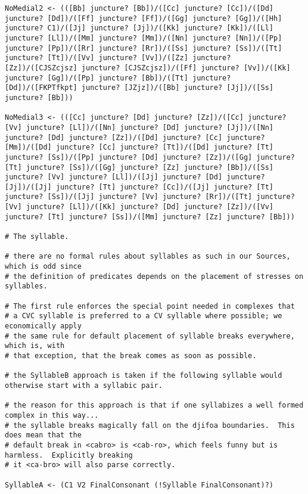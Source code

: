 \documentclass{article}
\begin{document}
\begin{verbatim}
NoMedial2 <- (([Bb] juncture? [Bb])/([Cc] juncture? [Cc])/([Dd] juncture? [Dd])/([Ff] juncture? [Ff])/([Gg] juncture? [Gg])/([Hh] juncture? C1)/([Jj] juncture? [Jj])/([Kk] juncture? [Kk])/([Ll] juncture? [Ll])/([Mm] juncture? [Mm])/([Nn] juncture? [Nn])/([Pp] juncture? [Pp])/([Rr] juncture? [Rr])/([Ss] juncture? [Ss])/([Tt] juncture? [Tt])/([Vv] juncture? [Vv])/([Zz] juncture? [Zz])/([CJSZcjsz] juncture? [CJSZcjsz])/([Ff] juncture? [Vv])/([Kk] juncture? [Gg])/([Pp] juncture? [Bb])/([Tt] juncture? [Dd])/([FKPTfkpt] juncture? [JZjz])/([Bb] juncture? [Jj])/([Ss] juncture? [Bb]))

NoMedial3 <- (([Cc] juncture? [Dd] juncture? [Zz])/([Cc] juncture? [Vv] juncture? [Ll])/([Nn] juncture? [Dd] juncture? [Jj])/([Nn] juncture? [Dd] juncture? [Zz])/([Dd] juncture? [Cc] juncture? [Mm])/([Dd] juncture? [Cc] juncture? [Tt])/([Dd] juncture? [Tt] juncture? [Ss])/([Pp] juncture? [Dd] juncture? [Zz])/([Gg] juncture? [Tt] juncture? [Ss])/([Gg] juncture? [Zz] juncture? [Bb])/([Ss] juncture? [Vv] juncture? [Ll])/([Jj] juncture? [Dd] juncture? [Jj])/([Jj] juncture? [Tt] juncture? [Cc])/([Jj] juncture? [Tt] juncture? [Ss])/([Jj] juncture? [Vv] juncture? [Rr])/([Tt] juncture? [Vv] juncture? [Ll])/([Kk] juncture? [Dd] juncture? [Zz])/([Vv] juncture? [Tt] juncture? [Ss])/([Mm] juncture? [Zz] juncture? [Bb]))

# The syllable.  

# there are no formal rules about syllables as such in our Sources, which is odd since
# the definition of predicates depends on the placement of stresses on syllables.

# The first rule enforces the special point needed in complexes that
# a CVC syllable is preferred to a CV syllable where possible; we economically apply
# the same rule for default placement of syllable breaks everywhere, which is, with
# that exception, that the break comes as soon as possible.

# the SyllableB approach is taken if the following syllable would otherwise start with a syllabic pair.

# the reason for this approach is that if one syllabizes a well formed complex in this way...
# the syllable breaks magically fall on the djifoa boundaries.  This does mean that the
# default break in <cabro> is <cab-ro>, which feels funny but is harmless.  Explicitly breaking
# it <ca-bro> will also parse correctly.

SyllableA <- (C1 V2 FinalConsonant (!Syllable FinalConsonant)?)


\end{verbatim}
\end{document}
